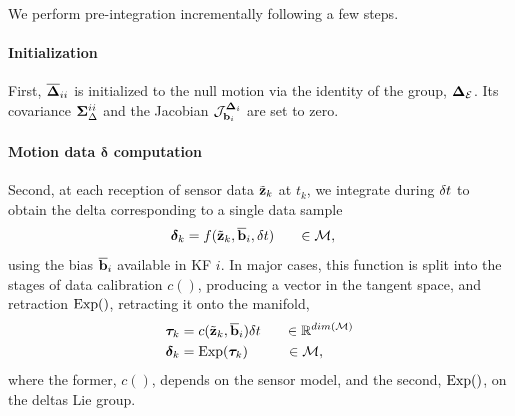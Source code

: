 We perform pre-integration incrementally following a few steps. 

\paragraph{Initialization}
First, $\overline{{{\bm \Delta}}}_{ii}$ is initialized to the null motion via the identity of the group, ${{\bm \Delta}}_{\mathcal{E}}$. 
Its covariance ${\bm \Sigma}_\Delta^{ii}$ and the Jacobian ${\mathcal{J}^{{{\bm \Delta}}_i}_{{\bf b}_i}}$ are set to zero. 

\paragraph{Motion data $\bm\delta$ computation}
Second, at each reception of sensor data $\tilde{{\bf z}}_k$ at $t_k$, we integrate during $\delta t$ to obtain the delta corresponding to a single data sample
%
\begin{align}
    \bm\delta_k &= f(\tilde{{\bf z}}_k, \overline{{\bf b}}_i, \delta t)  ~~~~~\in \mathcal{M}, 
    \label{eq:data2delta}
\end{align}
%
using the bias $\overline{{\bf b}}_i$ available in KF $i$. 
In major cases, this function is split into the stages of data calibration $c()$, producing a vector in the tangent space, and retraction $\operatorname*{Exp}()$, retracting it onto the manifold,
%
\begin{align}
    {\bm \tau}_k &= c(\tilde{{\bf z}}_k, \overline{{\bf b}}_i) \delta t ~~~~~\in \mathbb{R}^{dim(\mathcal{M})}\\
    \bm\delta_k &= \operatorname*{Exp}({\bm \tau}_k) ~~~~~~~~\in \mathcal{M},
\end{align}
%
where the former, $c()$, depends on the sensor model, and the second, $\operatorname*{Exp}()$, on the deltas Lie group.

